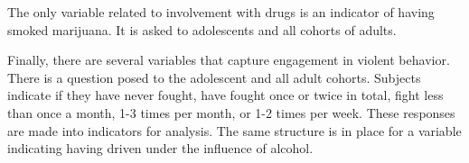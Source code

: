 The only variable related to involvement with drugs is an indicator of having smoked marijuana. It is asked to adolescents and all cohorts of adults.

Finally, there are several variables that capture engagement in violent behavior. There is a question posed to the adolescent and all adult cohorts. Subjects indicate if they have never fought, have fought once or twice in total, fight less than once a month, 1-3 times per month, or 1-2 times per week. These responses are made into indicators for analysis. The same structure is in place for a variable indicating having driven under the influence of alcohol.









